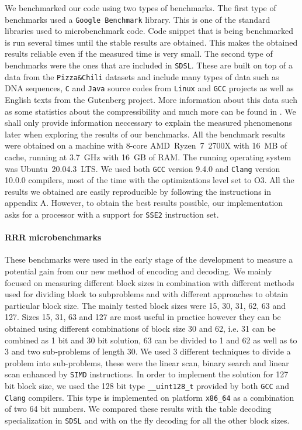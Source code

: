 We benchmarked our code using two types of benchmarks. The first type of benchmarks used
a \texttt{Google Benchmark} library. This is one of the standard libraries used to
microbenchmark code. Code snippet that is being benchmarked is run several times until
the stable results are obtained. This makes the obtained results reliable even if the
measured time is very small. The second type of benchmarks
were the ones that are included in \texttt{SDSL}. These are built on top of a data from the
\texttt{Pizza\&Chili} datasets \citep{ferragina2005pizza} and include many types of data such
as DNA sequences, \texttt{C} and \texttt{Java} source codes from \texttt{Linux} and \texttt{GCC}
projects as well as English texts from the Gutenberg project. More information about this
data such as some statistics about the compressibility and much more can be found in
\cite{ferragina2009compressed}. We shall only provide information neccessary to explain the
measured phenomenons later when exploring the results of our benchmarks. All the benchmark
results were obtained on a machine with 8-core AMD~Ryzen~7~2700X with 16~MB of cache, running
at 3.7~GHz with 16~GB of RAM. The running operating system was Ubuntu~20.04.3~LTS.
We used both \texttt{GCC} version 9.4.0 and \texttt{Clang} version 10.0.0 compilers,
most of the time with the optimizations level set to O3. All the results we obtained are
easily reproducible by following the instructions in appendix A. However, to obtain
the best results possible, our implementation asks for a processor with a support for \texttt{SSE2}
instruction set.

\paragraph{RRR microbenchmarks}

These benchmarks were used in the early stage of the development to measure a potential gain from
our new method of encoding and decoding. We mainly focused on measuring different block sizes
in combination with different methods used for dividing block to subproblems and with different
approaches to obtain particular block size. The mainly tested block sizes were 15, 30, 31, 62, 63
and 127. Sizes 15, 31, 63 and 127 are most useful in practice however they can be obtained using
different combinations of block size 30 and 62, i.e. 31 can be combined as 1 bit and 30 bit solution,
63 can be divided to 1 and 62 as well as to 3 and two sub-problems of length 30.
We used 3 different techniques to divide a problem into sub-problems, these were the linear scan,
binary search and linear scan enhanced by \texttt{SIMD} instructions. In order to implement the
solution for 127 bit block size, we used the 128 bit type \texttt{\_\_uint128\_t} provided by both
\texttt{GCC} and \texttt{Clang} compilers. This type is implemented on platform \texttt{x86\_64}
as a combination of two 64 bit numbers. We compared these results with the table decoding specialization
in \texttt{SDSL} and with on the fly decoding for all the other block sizes. 

